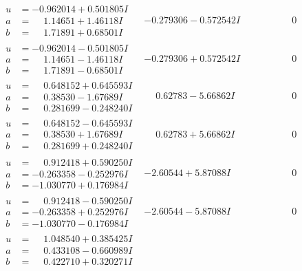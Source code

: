 \documentclass[1p]{elsarticle_modified}
\theoremstyle{definition}
\begin{document}
$$\begin{array}{c|c|c}
\begin{aligned}
u &= -0.962014 + 0.501805 I \\
a &= \phantom{-}1.14651 + 1.46118 I \\
b &= \phantom{-}1.71891 + 0.68501 I\end{aligned}
 & -0.279306 - 0.572542 I & \phantom{-0.000000 } 0 \\ \hline\begin{aligned}
u &= -0.962014 - 0.501805 I \\
a &= \phantom{-}1.14651 - 1.46118 I \\
b &= \phantom{-}1.71891 - 0.68501 I\end{aligned}
 & -0.279306 + 0.572542 I & \phantom{-0.000000 } 0 \\ \hline\begin{aligned}
u &= \phantom{-}0.648152 + 0.645593 I \\
a &= \phantom{-}0.38530 - 1.67689 I \\
b &= \phantom{-}0.281699 - 0.248240 I\end{aligned}
 & \phantom{-}0.62783 - 5.66862 I & \phantom{-0.000000 } 0 \\ \hline\begin{aligned}
u &= \phantom{-}0.648152 - 0.645593 I \\
a &= \phantom{-}0.38530 + 1.67689 I \\
b &= \phantom{-}0.281699 + 0.248240 I\end{aligned}
 & \phantom{-}0.62783 + 5.66862 I & \phantom{-0.000000 } 0 \\ \hline\begin{aligned}
u &= \phantom{-}0.912418 + 0.590250 I \\
a &= -0.263358 - 0.252976 I \\
b &= -1.030770 + 0.176984 I\end{aligned}
 & -2.60544 + 5.87088 I & \phantom{-0.000000 } 0 \\ \hline\begin{aligned}
u &= \phantom{-}0.912418 - 0.590250 I \\
a &= -0.263358 + 0.252976 I \\
b &= -1.030770 - 0.176984 I\end{aligned}
 & -2.60544 - 5.87088 I & \phantom{-0.000000 } 0 \\ \hline\begin{aligned}
u &= \phantom{-}1.048540 + 0.385425 I \\
a &= \phantom{-}0.433108 - 0.660989 I \\
b &= \phantom{-}0.422710 + 0.320271 I\end{aligned}

\end{array}$$
\end{document}
